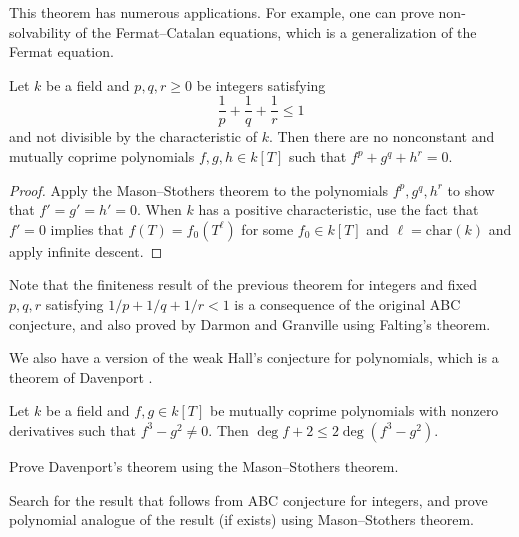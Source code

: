 This theorem has numerous applications.
For example, one can prove non-solvability of the Fermat--Catalan equations, which is a generalization of the Fermat equation.
\begin{theorem}
    Let \( k \) be a field and \( p, q, r \ge 0 \) be integers satisfying
    \begin{equation}
        \label{eqn:abc-pqr}
        \frac{1}{p} + \frac{1}{q} + \frac{1}{r} \le 1
    \end{equation}
    and not divisible by the characteristic of \( k \).
    Then there are no nonconstant and mutually coprime polynomials \( f, g, h \in k[T] \) such that \( f^p + g^q + h^r = 0 \).
\end{theorem}
\begin{proof}
    Apply the Mason--Stothers theorem to the polynomials \( f^p, g^q, h^r \) to show that \( f' = g' = h' = 0 \).
    When \( k \) has a positive characteristic, use the fact that \( f' = 0 \) implies that \( f(T) = f_0(T^\ell) \) for some \( f_0 \in k[T] \) and \( \ell = \mathrm{char}(k) \) and apply infinite descent.
\end{proof}

Note that the finiteness result of the previous theorem for integers and fixed \(p, q, r\) satisfying \( 1 / p + 1 / q + 1 / r < 1 \) is a consequence of the original ABC conjecture, and also proved by Darmon and Granville \cite{darmon1995equations} using Falting's theorem.

We also have a version of the weak Hall's conjecture for polynomials, which is a theorem of Davenport \cite{davenport1965f3}.
\begin{theorem}
    Let \( k \) be a field and \( f, g \in k[T] \) be mutually coprime polynomials with nonzero derivatives such that \( f^3 - g^2 \ne 0 \).
    Then \( \deg f + 2 \le 2 \deg (f^3 - g^2) \).
\end{theorem}

\begin{exercise}
    Prove Davenport's theorem using the Mason--Stothers theorem.
\end{exercise}

\begin{exercise}
    Search for the result that follows from ABC conjecture for integers, and prove polynomial analogue of the result (if exists) using Mason--Stothers theorem.
\end{exercise}

\newpage